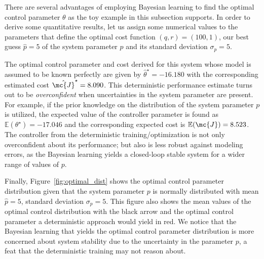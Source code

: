 There are several advantages of employing Bayesian learning to find the optimal
control parameter $\theta$ as the toy example in this subsection supports. 
%
In order to derive some quantitative results, let us assign some numerical
values to the parameters that define the optimal cost function $(q,r) = (100, 1)$, our best
guess $\hat{p} = 5$ of the system parameter $p$ and its standard deviation $\sigma_p = 5$.


The optimal control parameter and cost derived for this system whose model is
assumed to be known perfectly are given by $\hat{\theta}^\star = -16.180$ with
the corresponding estimated cost $\hat{\mc{J}}^\star = 8.090$.
%
This deterministic performance estimate turns out to be \textit{overconfident} when
uncertainties in the system parameter are present. 
%
For example, if the prior knowledge on the distribution of the system parameter
$p$ is utilized, the expected value of the controller parameter is found as
$\mathbb{E}(\theta^\star) = -17.046$ and the corresponding expected cost is
$\mathbb{E}(\mc{J}) = 8.523$. 
%
The controller from the deterministic training/optimization is not only
overconfident about its performance; but also is less robust against modeling
errors, as the Bayesian learning yields a closed-loop stable system for a wider
range of values of $p$.

Finally, Figure~\ref{fig:optimal_dist} shows the optimal control parameter
distribution given that the system parameter $p$ is normally distributed with
mean $\hat{p} = 5$, standard deviation $\sigma_p = 5$.
%
This figure also shows the mean values of the optimal control distribution with
the black arrow and the optimal control parameter a deterministic approach would
yield in red. 
%
We notice that the Bayesian learning that yields the optimal control parameter
distribution is more concerned about system stability due to the uncertainty in
the parameter $p$, a feat that the deterministic training may not reason about.







